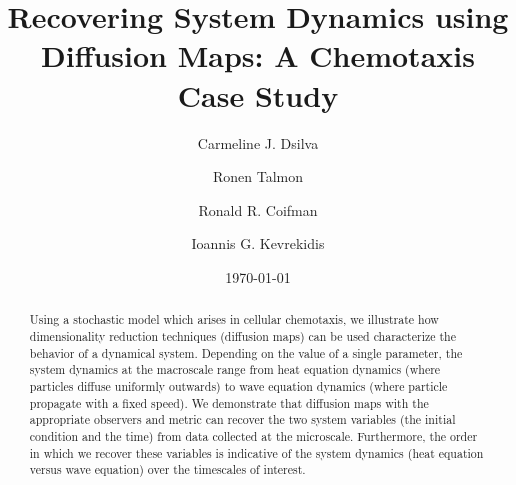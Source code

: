 \documentclass[prl, reprint, final, showkeys]{revtex4-1}
\begin{document}
\title{Recovering System Dynamics using Diffusion Maps: A Chemotaxis Case Study}

\author{Carmeline J. Dsilva}

\author{Ronen Talmon}

\author{Ronald R. Coifman}

\author{Ioannis G. Kevrekidis}

\date{\today}

\begin{abstract}

Using a stochastic model which arises in cellular chemotaxis, we illustrate how dimensionality reduction techniques (diffusion maps) can be used characterize the behavior of a dynamical system.
%
Depending on the value of a single parameter, the system dynamics at the macroscale range from heat equation dynamics (where particles diffuse uniformly outwards) to wave equation dynamics (where particle propagate with a fixed speed). 
%
We demonstrate that diffusion maps with the appropriate observers and metric can recover the two system variables (the initial condition and the time) from data collected at the microscale. 
%
Furthermore, the order in which we recover these variables is indicative of the system dynamics (heat equation versus wave equation) over the timescales of interest.
%
%
%
%	
%

\end{abstract}
\end{document}
